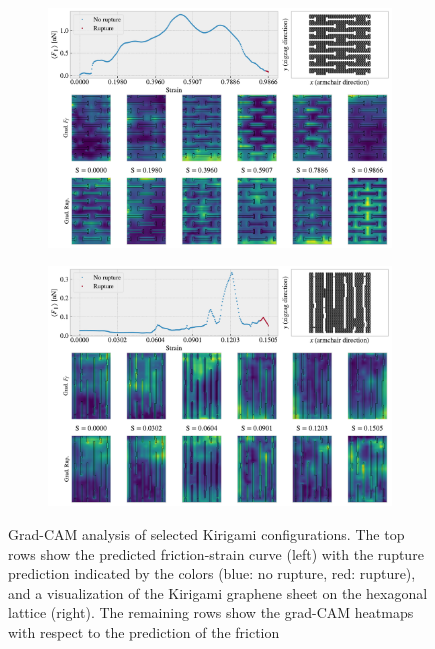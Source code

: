 \begin{figure}[!htb]\ContinuedFloat
  \centering
  \begin{subfigure}[t]{1\textwidth}
      \centering
      \includegraphics[width=0.8\linewidth]{figures/search/grad_cam_hon_3_3_5_3_12_0.pdf}
      \caption{}
      \label{fig:GC_hon_search}
  \end{subfigure}
  \hfill
  \begin{subfigure}[t]{1\textwidth}
    \centering
    \includegraphics[width=0.8\linewidth]{figures/search/grad_cam_RW_search_max_drop0.pdf}
    \caption{}
    \label{fig:GC_RW_search}
\end{subfigure}
\hfill
  \caption{Grad-CAM analysis of selected Kirigami configurations. The top rows
  show the predicted friction-strain curve (left) with the rupture prediction
  indicated by the colors (blue: no rupture, red: rupture), and a visualization
  of the Kirigami graphene sheet on the hexagonal lattice (right). The remaining
  rows show the grad-CAM heatmaps with respect to the prediction of the friction
}
\end{figure}
